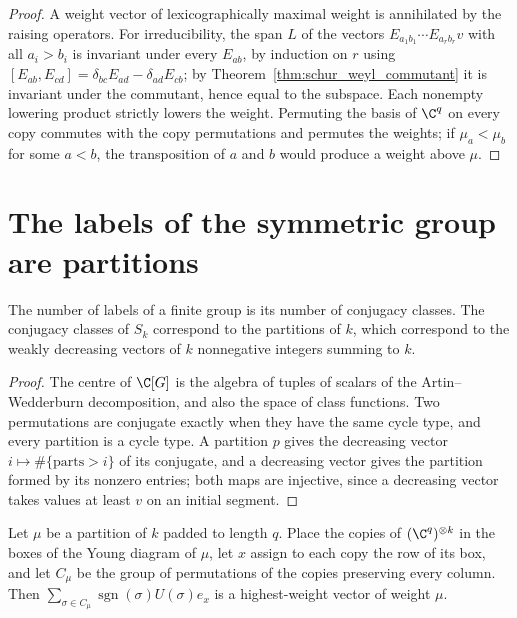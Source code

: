 \begin{proof}\leanok
    A weight vector of lexicographically maximal weight is annihilated by the
    raising operators. For irreducibility, the span $L$ of the vectors
    $E_{a_1b_1}\cdots E_{a_rb_r}v$ with all $a_i>b_i$ is invariant under every
    $E_{ab}$, by induction on $r$ using
    $[E_{ab},E_{cd}]=\delta_{bc}E_{ad}-\delta_{ad}E_{cb}$; by
    Theorem~\ref{thm:schur_weyl_commutant} it is invariant under the commutant,
    hence equal to the subspace. Each nonempty lowering product strictly
    lowers the weight. Permuting the basis of $\C^q$ on every copy commutes with
    the copy permutations and permutes the weights; if $\mu_a<\mu_b$ for some
    $a<b$, the transposition of $a$ and $b$ would produce a weight above $\mu$.
\end{proof}

\section{The labels of the symmetric group are partitions}

\begin{lemma}
    \label{lem:count_labels}
    \leanok
    The number of labels of a finite group is its number of conjugacy classes.
    The conjugacy classes of $S_k$ correspond to the partitions of $k$, which
    correspond to the weakly decreasing vectors of $k$ nonnegative integers
    summing to $k$.
\end{lemma}

\begin{proof}\leanok
    The centre of $\C[G]$ is the algebra of tuples of scalars of the
    Artin--Wedderburn decomposition, and also the space of class functions. Two
    permutations are conjugate exactly when they have the same cycle type, and
    every partition is a cycle type. A partition $p$ gives the decreasing vector
    $i\mapsto\#\{\text{parts}>i\}$ of its conjugate, and a decreasing vector gives
    the partition formed by its nonzero entries; both maps are injective, since a
    decreasing vector takes values at least $v$ on an initial segment.
\end{proof}

\begin{lemma}
    \label{lem:column_antisymmetrizer}
    \leanok
    Let $\mu$ be a partition of $k$ padded to length $q$. Place the copies of
    $(\C^q)^{\otimes k}$ in the boxes of the Young diagram of $\mu$, let $x$ assign
    to each copy the row of its box, and let $C_\mu$ be the group of permutations
    of the copies preserving every column. Then
    $\sum_{\sigma\in C_\mu}\operatorname{sgn}(\sigma)U(\sigma)e_x$ is a
    highest-weight vector of weight $\mu$.
\end{lemma}

